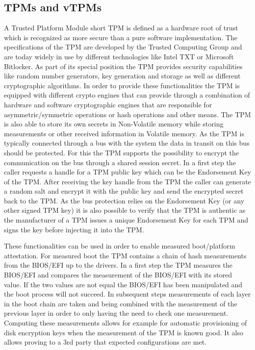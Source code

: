 \documentclass[sigplan,screen,nonacm]{acmart}
\begin{document}
\subsection{TPMs and vTPMs}
\label{chap:TPM}
A Trusted Platform Module short TPM is defined as a hardware root of trust which is recognized as more secure than a pure software implementation\cite[p.1]{TPM}.
The specifications of the TPM are developed by the Trusted Computing Group and are today widely in use by different technologies like Intel TXT\cite[p.15]{Intel-TXT} or Microsoft Bitlocker\cite{Bitlocker}.
As part of its special position the TPM provides security capabilities like random number generators, key generation and storage as well as different cryptographic algorithms.
In order to provide these functionalities the TPM is equipped with different crypto engines that can provide through a combination of hardware and software cryptographic engines that are responsible for asymmetric/symmetric operations or hash operations and other means\cite[p. 69]{TPM-Arch}.
The TPM is also able to store its own secrets in Non-Volatile memory while storing measurements or other received information in Volatile memory\cite[p. 69]{TPM-Arch}.
As the TPM is typically connected through a bus with the system the data in transit on this bus should be protected.
For this the TPM supports the possibility to encrypt the communication on the bus through a shared session secret\cite[p. 11]{TPM-Mitigation}.
In a first step the caller requests a handle for a TPM public key which can be the Endorsement Key of the TPM.
After receiving the key handle from the TPM the caller can generate a random salt and encrypt it with the public key and send the encrypted secret back to the TPM\cite[p. 13]{TPM-Mitigation}.
As the bus protection relies on the Endorsement Key (or any other signed TPM key) it is also possible to verify that the TPM is authentic as the manufacturer of a TPM issues a unique Endorsement Key for each TPM and signs the key before injecting it into the TPM.

These functionalities can be used in order to enable measured boot/platform attestation.
For measured boot the TPM contains a chain of hash measurements from the BIOS/EFI up to the drivers.
In a first step the TPM measures the BIOS/EFI and compares the measurement of the BIOS/EFI with its stored value.
If the two values are not equal the BIOS/EFI has been manipulated and the boot process will not succeed.
In subsequent steps measurements of each layer in the boot chain are taken and being combined with the measurement of the previous layer in order to only having the need to check one measurement.
Computing these measurements allows for example for automatic provisioning of disk encryption keys when the measurement of the TPM is known good.
It also allows proving to a 3rd party that expected configurations are met.
\end{document}

